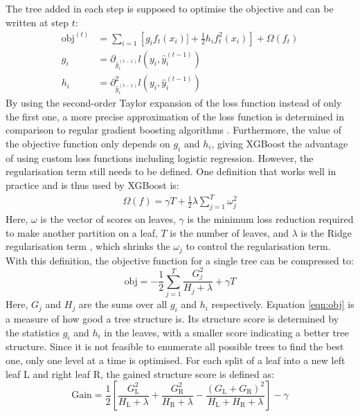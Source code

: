 The tree added in each step is supposed to optimise the objective and can be written at step $t$:
\begin{align}
  \text{obj}^{(t)} &= \sum_{i=1} \left[g_i f_t(x_i)] + \frac{1}{2}h_i f_t^2(x_i)\right] + \Omega(f_t)  \\
  g_i &= \partial_{\hat{y}_i^{(t-1)}} l(y_i, \hat{y}_i^{(t-1)}) \\
  h_i &= \partial^2_{\hat{y}_i^{(t-1)}} l(y_i, \hat{y}_i^{(t-1)})
\end{align}
By using the second-order Taylor expansion of the loss function instead of only the first one, a more precise approximation of the loss function is determined in comparison
to regular gradient boosting algorithms \cite{newton_boosting}.
Furthermore, the value of the objective function only depends on $g_i$ and $h_i$, giving XGBoost the advantage of using custom loss functions including logistic regression.
However, the regularisation term still needs to be defined. One definition that works well in practice and is thus used by XGBoost is:
\begin{align}
  \Omega (f) = \gamma T + \frac{1}{2}\lambda \sum_{j=1}^T \omega_j^2
\end{align}
Here, $\omega$ is the vector of scores on leaves, $\gamma$ is the minimum loss reduction required to make
another partition on a leaf, $T$ is the number of leaves, and $\lambda$ is the Ridge regularisation term \cite{ridge}, which shrinks the $\omega_j$ to control the
regularisation term. \\
With this definition, the objective function for a single tree can be compressed to:
\begin{equation} \label{eqn:obj}
  \text{obj} = -\frac{1}{2}\sum_{j=1}^T \frac{G_j^2}{H_j + \lambda} + \gamma T
\end{equation}
Here, $G_j$ and $H_j$ are the sums over all $g_i$ and $h_i$ respectively. Equation \ref{eqn:obj} is a measure of how good a tree structure is. Its structure score
is determined by the statistics $g_i$ and $h_i$ in the leaves, with a smaller score indicating a better tree structure.
Since it is not feasible to enumerate all possible trees to find the best one, only one level at a time is optimised.
For each split of a leaf into a new left leaf L and right leaf R, the gained structure score is defined as:
\begin{equation}
  \text{Gain} = \frac{1}{2}\left[\frac{G_{\text{L}}^2}{H_{\text{L}} + \lambda} + \frac{G_{\text{R}}^2}{H_{\text{R}} + \lambda} - \frac{(G_{\text{L}} + G_{\text{R}})^2}{H_{\text{L}}+H_{\text{R}}+\lambda}\right] -\gamma
\end{equation}

